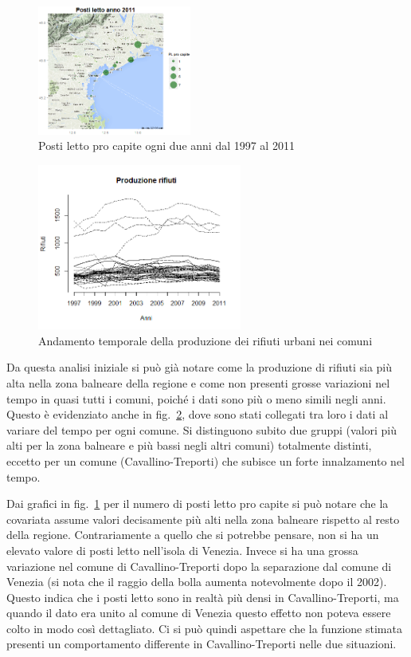 \documentclass[a4paper,11pt,twoside,openright]{book}							%
\begin{document}
\begin{figure}[H]
	\includegraphics[trim=0cm 0cm 0cm 0cm,clip=true,width=0.45\textwidth]{Immagini/venezia_dati/PL2011.png}
	\caption{Posti letto pro capite ogni due anni dal 1997 al 2011}
	\label{fig:Ven_bubblePL}
\end{figure}
\newpage
\begin{figure}[t]
\centering
	\includegraphics[width=0.60\textwidth]{Immagini/Matplot.png}   
 \caption{Andamento temporale della produzione dei rifiuti urbani nei comuni}
   \label{fig:Ven_matplot}
\end{figure}
Da questa analisi iniziale si può già notare come la produzione di rifiuti sia più alta nella zona balneare della regione e come non presenti grosse variazioni nel tempo in quasi tutti i comuni, poiché i dati sono più o meno simili negli anni. Questo è evidenziato anche in fig.~\ref{fig:Ven_matplot}, dove sono stati collegati tra loro i dati al variare del tempo per ogni comune. Si distinguono subito due gruppi (valori più alti per la zona balneare e più bassi negli altri comuni) totalmente distinti, eccetto per un comune (Cavallino-Treporti) che subisce un forte innalzamento nel tempo.

Dai grafici in fig.~\ref{fig:Ven_bubblePL} per il numero di posti letto pro capite si può notare che la covariata assume valori decisamente più alti nella zona balneare rispetto al resto della regione. Contrariamente a quello che si potrebbe pensare, non si ha un elevato valore di posti letto nell'isola di Venezia. Invece si ha una grossa variazione nel comune di Cavallino-Treporti dopo la separazione dal comune di Venezia (si nota che il raggio della bolla aumenta notevolmente dopo il 2002). Questo indica che i posti letto sono in realtà più densi in Cavallino-Treporti, ma quando il dato era unito al comune di Venezia questo effetto non poteva essere colto in modo così dettagliato. Ci si può quindi aspettare che la funzione stimata presenti un comportamento differente in Cavallino-Treporti nelle due situazioni.
\end{document}
